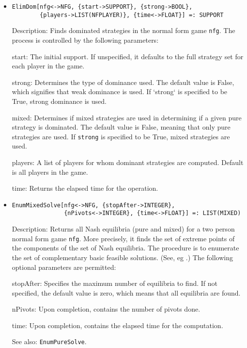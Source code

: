 \begin{itemize}
\item
\protect \large \begin{verbatim}
ElimDom[nfg<->NFG, {start->SUPPORT}, {strong->BOOL}, 
        {players->LIST(NFPLAYER)}, {time<->FLOAT}] =: SUPPORT
\end{verbatim} \normalsize

\bd
\item
[Description:] Finds dominated strategies in the normal form game \verb+nfg+.
The process is controlled by the following parameters:

\bd
\item
[start:] The initial support.  If unspecified, it defaults to the full
strategy set for each player in the game.  
\item
[strong:] Determines the type of dominance used.  The default value is
False, which signifies that weak dominance is used.  If `strong` is
specified to be True, strong dominance is used.
\item
[mixed:] Determines if mixed strategies are used in determining if a
given pure strategy is dominated.  The default value is False, meaning
that only pure strategies are used. If \verb+strong+ is specified to
be True, mixed strategies are used.
\item
[players:] A list of players for whom dominant strategies are
computed.  Default is all players in the game.  
\item
[time:] Returns the elapsed time for the operation.
\ed
\ed

\item
\protect \large \begin{verbatim}
EnumMixedSolve[nfg<->NFG, {stopAfter->INTEGER},
               {nPivots<->INTEGER}, {time<->FLOAT}] =: LIST(MIXED)
\end{verbatim}\normalsize

\bd
\item
[Description:] Returns all Nash equilibria (pure and mixed) for a two
person normal form game \verb+nfg+.  More precisely, it finds the set
of extreme points of the components of the set of Nash equilibria.
The procedure is to enumerate the set of complementary basic feasible
solutions. (See, eg \cite[1964]{Man:64}.)  The following optional
parameters are permitted: 
\bd
\item
[stopAfter:] Specifies the maximum number of equilibria to find.  If
not specified, the default value is zero, which means that all
equilibria are found.
\item
[nPivots:] Upon completion, contains the number of pivots done.
\item
[time:] Upon completion, contains the elapsed time for the computation.
\ed
\item
[See also:] {\tt EnumPureSolve}.
\ed


\end{itemize}
